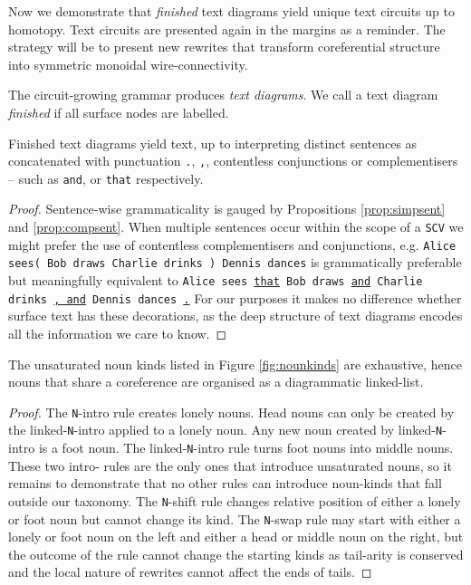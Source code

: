 Now we demonstrate that \emph{finished} text diagrams yield unique text circuits up to homotopy. Text circuits are presented again in the margins as a reminder. The strategy will be to present new rewrites that transform coreferential structure into symmetric monoidal wire-connectivity.

\begin{defn}
The circuit-growing grammar produces \emph{text diagrams}. We call a text diagram \emph{finished} if all surface nodes are labelled.
\end{defn}

\begin{proposition}
Finished text diagrams yield text, up to interpreting distinct sentences as concatenated with punctuation \texttt{.}, \texttt{,}, contentless conjunctions or complementisers -- such as \texttt{and}, or \texttt{that} respectively.
\begin{proof}
Sentence-wise grammaticality is gauged by Propositions \ref{prop:simpsent} and \ref{prop:compsent}. When multiple sentences occur within the scope of a \texttt{SCV} we might prefer the use of contentless complementisers and conjunctions, e.g. \texttt{Alice sees( Bob draws Charlie drinks ) Dennis dances} is grammatically preferable but meaningfully equivalent to \texttt{Alice sees \underline{that} Bob draws \underline{and} Charlie drinks \underline{, and} Dennis dances \underline{.}} For our purposes it makes no difference whether surface text has these decorations, as the deep structure of text diagrams encodes all the information we care to know.
\end{proof}
\end{proposition}

\begin{lemma}\label{prop:linkedlist}
The unsaturated noun kinds listed in Figure \ref{fig:nounkinds} are exhaustive, hence nouns that share a coreference are organised as a diagrammatic linked-list.
\begin{proof}
The \texttt{N}-intro rule creates lonely nouns. Head nouns can only be created by the linked-\texttt{N}-intro applied to a lonely noun. Any new noun created by linked-\texttt{N}-intro is a foot noun. The linked-\texttt{N}-intro rule turns foot nouns into middle nouns. These two intro- rules are the only ones that introduce unsaturated nouns, so it remains to demonstrate that no other rules can introduce noun-kinds that fall outside our taxonomy. The \texttt{N}-shift rule changes relative position of either a lonely or foot noun but cannot change its kind. The \texttt{N}-swap rule may start with either a lonely or foot noun on the left and either a head or middle noun on the right, but the outcome of the rule cannot change the starting kinds as tail-arity is conserved and the local nature of rewrites cannot affect the ends of tails.
\end{proof}
\end{lemma}

